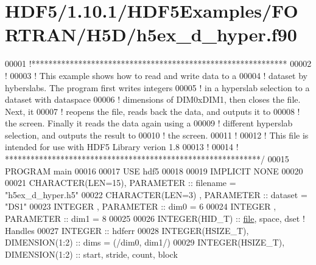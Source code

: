 \hypertarget{_h_d_f5_21_810_81_2_h_d_f5_examples_2_f_o_r_t_r_a_n_2_h5_d_2h5ex__d__hyper_8f90_source}{}\section{H\+D\+F5/1.10.1/\+H\+D\+F5\+Examples/\+F\+O\+R\+T\+R\+A\+N/\+H5\+D/h5ex\+\_\+d\+\_\+hyper.f90}
\label{_h_d_f5_21_810_81_2_h_d_f5_examples_2_f_o_r_t_r_a_n_2_h5_d_2h5ex__d__hyper_8f90_source}

\begin{DoxyCode}
00001 \textcolor{comment}{!************************************************************}
00002 \textcolor{comment}{!}
00003 \textcolor{comment}{!  This example shows how to read and write data to a}
00004 \textcolor{comment}{!  dataset by hyberslabs.  The program first writes integers}
00005 \textcolor{comment}{!  in a hyperslab selection to a dataset with dataspace}
00006 \textcolor{comment}{!  dimensions of DIM0xDIM1, then closes the file.  Next, it}
00007 \textcolor{comment}{!  reopens the file, reads back the data, and outputs it to}
00008 \textcolor{comment}{!  the screen.  Finally it reads the data again using a}
00009 \textcolor{comment}{!  different hyperslab selection, and outputs the result to}
00010 \textcolor{comment}{!  the screen.}
00011 \textcolor{comment}{!}
00012 \textcolor{comment}{!  This file is intended for use with HDF5 Library verion 1.8}
00013 \textcolor{comment}{!}
00014 \textcolor{comment}{! ************************************************************/}
00015 \textcolor{keyword}{PROGRAM} main
00016 
00017   \textcolor{keywordtype}{USE }hdf5
00018 
00019   \textcolor{keywordtype}{IMPLICIT NONE}
00020 
00021   \textcolor{keywordtype}{CHARACTER(LEN=15)}, \textcolor{keywordtype}{PARAMETER} :: filename = \textcolor{stringliteral}{"h5ex\_d\_hyper.h5"}
00022   \textcolor{keywordtype}{CHARACTER(LEN=3)} , \textcolor{keywordtype}{PARAMETER} :: dataset  = \textcolor{stringliteral}{"DS1"}
00023   \textcolor{keywordtype}{INTEGER}          , \textcolor{keywordtype}{PARAMETER} :: dim0     = 6
00024   \textcolor{keywordtype}{INTEGER}          , \textcolor{keywordtype}{PARAMETER} :: dim1     = 8
00025 
00026   \textcolor{keywordtype}{INTEGER(HID\_T)}  :: \hyperlink{structfile}{file}, space, dset \textcolor{comment}{! Handles}
00027   \textcolor{keywordtype}{INTEGER}         :: hdferr
00028   \textcolor{keywordtype}{INTEGER(HSIZE\_T)}, \textcolor{keywordtype}{DIMENSION(1:2)} :: dims = (/dim0, dim1/)
00029   \textcolor{keywordtype}{INTEGER(HSIZE\_T)}, \textcolor{keywordtype}{DIMENSION(1:2)}   :: start, stride, count, block

\end{DoxyCode}
